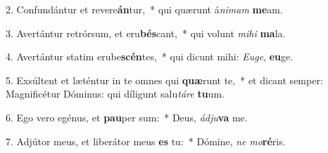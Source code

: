 2. Confundántur et revere\textbf{án}tur,~*  qui quærunt á\textit{ni}\textit{mam} \textbf{me}am.\

3. Avertántur retrórsum, et eru\textbf{bés}cant,~*  qui volunt \textit{mi}\textit{hi} \textbf{ma}la.\

4. Avertántur statim erube\textbf{scén}tes,~*  qui dicunt mihi: \textit{Eu}\textit{ge}, \textbf{eu}ge.\

5. Exsúltent et læténtur in te omnes qui \textbf{quæ}runt te,~*  et dicant semper: Magnificétur Dóminus: qui díligunt salu\textit{tá}\textit{re} \textbf{tu}um.\

6. Ego vero egénus, et \textbf{pau}per sum:~*  Deus, \textit{ád}\textit{ju}\textbf{va} me.\

7. Adjútor meus, et liberátor meus \textbf{es} tu:~*  Dómine, \textit{ne} \textit{mo}\textbf{ré}ris.\

